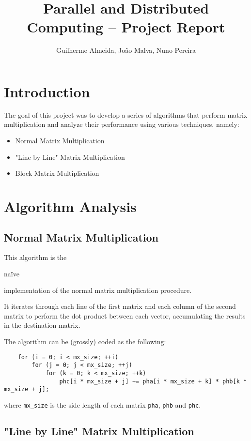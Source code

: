\documentclass[11pt,a4paper]{article}
\title{Parallel and Distributed Computing -- \nth{1} Project Report}
\author{Guilherme Almeida, João Malva, Nuno Pereira}
\begin{document}
\maketitle

\section{Introduction}

The goal of this project was to develop a series of algorithms that perform matrix multiplication and analyze their performance using various techniques, namely:

\begin{itemize}
    \item Normal Matrix Multiplication
    \item "Line by Line" Matrix Multiplication
    \item Block Matrix Multiplication
\end{itemize}

\section{Algorithm Analysis}

\subsection{Normal Matrix Multiplication}

This algorithm is the \begin{em}naïve\end{em} implementation of the normal matrix multiplication procedure.

It iterates through each line of the first matrix and each column of the second matrix to perform the dot product between each vector, accumulating the results in the destination matrix.

The algorithm can be (grossly) coded as the following:
\begin{lstlisting}
    for (i = 0; i < mx_size; ++i)
        for (j = 0; j < mx_size; ++j)
            for (k = 0; k < mx_size; ++k)
                phc[i * mx_size + j] += pha[i * mx_size + k] * phb[k * mx_size + j];
\end{lstlisting}
where \lstinline{mx_size} is the side length of each matrix \lstinline{pha}, \lstinline{phb} and \lstinline{phc}.

\subsection{"Line by Line" Matrix Multiplication}
\end{document}
